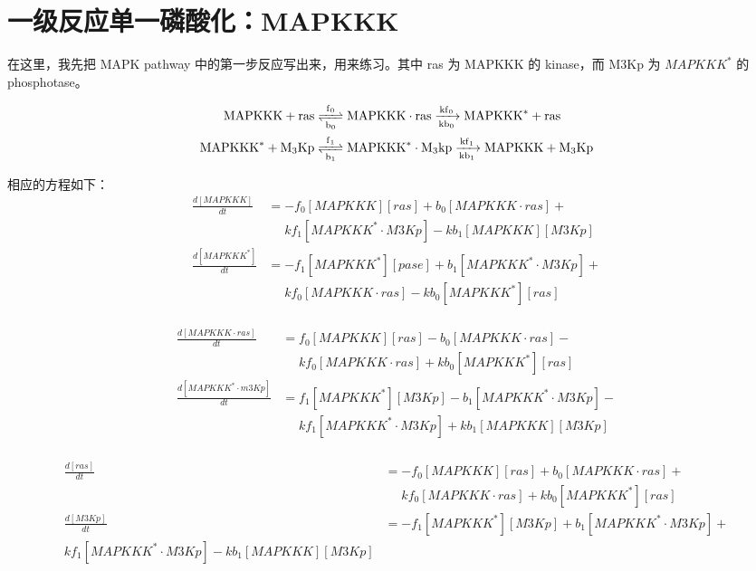 \section{一级反应单一磷酸化：MAPKKK}
在这里，我先把 MAPK pathway 中的第一步反应写出来，用来练习。其中 ras 为 MAPKKK 的 kinase，而 M3Kp 为 $MAPKKK^{*}$ 的 phosphotase。

\small
\begin{align*}
  \ce{MAPKKK + ras &<=>[f_{0}][b_{0}] MAPKKK\cdot{}ras ->[kf_{0}][kb_{0}] MAPKKK^{*} + ras\\
    MAPKKK^{*} + M3Kp &<=>[f_{1}][b_{1}] MAPKKK^{*}\cdot{}M3kp ->[kf_{1}][kb_{1}] MAPKKK + M3Kp}
\end{align*}
\normalsize


相应的方程如下：
\small
\begin{equation*}
  \begin{align*}
    \frac{d[MAPKKK]}{dt} &= -f_{0}[MAPKKK][ras] + b_{0}[MAPKKK\cdot{}ras] +\\
    &\phantom{=} kf_{1}[MAPKKK^{*}\cdot{}M3Kp] - kb_{1}[MAPKKK][M3Kp]\\
    \frac{d[MAPKKK^{*}]}{dt} &= -f_{1}[MAPKKK^{*}][pase] + b_{1}[MAPKKK^{*}\cdot{}M3Kp] +\\
    &\phantom{=} kf_{0}[MAPKKK\cdot{}ras] - kb_{0}[MAPKKK^{*}][ras] \\
  \end{align*}
\end{equation*}

\begin{equation*}
  \begin{align*}
    \frac{d[MAPKKK\cdot{}ras]}{dt} &= f_{0}[MAPKKK][ras] - b_{0}[MAPKKK\cdot{}ras] -\\
    &\phantom{=} kf_{0}[MAPKKK\cdot{}ras] + kb_{0}[MAPKKK^{*}][ras]\\
    \frac{d[MAPKKK^{*}\cdot{}m3Kp]}{dt} &= f_{1}[MAPKKK^{*}][M3Kp] - b_{1}[MAPKKK^{*}\cdot{}M3Kp] -\\
    &\phantom{=} kf_{1}[MAPKKK^{*}\cdot{}M3Kp] + kb_{1}[MAPKKK][M3Kp]\\
  \end{align*}
\end{equation*}

\begin{equation*}
  \begin{align*}
    \frac{d[ras]}{dt} &= -f_{0}[MAPKKK][ras] + b_{0}[MAPKKK \cdot{}ras] +\\
    &\phantom{=} kf_{0}[MAPKKK\cdot{}ras] + kb_{0}[MAPKKK^{*}][ras]\\
    \frac{d[M3Kp]}{dt} &= -f_{1}[MAPKKK^{*}][M3Kp] + b_{1}[MAPKKK^{*}\cdot{}M3Kp] +\\
    kf_{1}[MAPKKK^{*}\cdot{}M3Kp] - kb_{1}[MAPKKK][M3Kp]\\
  \end{align*}
\end{equation*}
\normalsize


